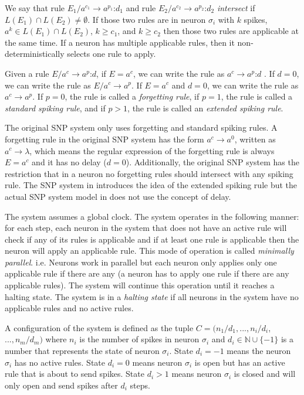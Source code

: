 \documentclass[]{elsarticle}
\theoremstyle{definition}
\theoremstyle{definition}
\newcommand{\ra}{\rightarrow}
\newcommand{\sm}{\text{:}}
\begin{document}
We say that rule $E_1/a^{c_1}\ra a^{p_1}\sm d_1$ and rule $E_2/a^{c_2}\ra a^{p_2}\sm d_2$ \emph{intersect}
if $L(E_1) \cap L(E_2) \neq \emptyset$. If those two rules are in neuron $\sigma_i$ with $k$ spikes,
$a^k \in L(E_1) \cap L(E_2)$, $k\geq c_1$, and $k\geq c_2$ then those two rules are applicable at
the same time. If a neuron has multiple applicable rules, then it non-deterministically selects one
rule to apply.

Given a rule $E/a^c \ra a^p\sm d$, if $E = a^c$, we can write the rule as $a^c \ra a^p\sm d$ . If $d=0$, 
we can write the rule as $E/a^c \ra a^p$. If $E=a^c$ and $d=0$, we can write the rule as $a^c \ra 
a^p$. If $p=0$, the rule is called a \emph{forgetting rule}, if $p=1$, the rule is called a 
\emph{standard spiking rule}, and if $p>1$, the rule is called an \emph{extended spiking rule}.

The original SNP system \cite{ionescu-2006-snp} only uses forgetting and standard spiking rules.
A forgetting rule in the original SNP system has the form $a^c \ra a^0$, written as $a^c\ra\lambda$,
which means the regular expression of the forgetting rule is always $E=a^c$ and it has no delay
($d=0$). Additionally, the original SNP system has the restriction that in a neuron no forgetting 
rules should intersect with any spiking rule. The SNP system in \cite{chen-2008-snp-e} introduces
the idea of the extended spiking rule but the actual SNP system model in \cite{chen-2008-snp-e} does
not use the concept of delay. 

The system assumes a global clock. The system operates in the following manner: for each step, each 
neuron in the system that does not have an active rule will check if any of its rules is applicable 
and if at least one rule is applicable then the neuron will apply an applicable rule. This mode of
operation is called \emph{minimally parallel}. i.e. Neurons work in parallel but each neuron only
applies only one applicable rule if there are any (a neuron has to apply one rule if there are any
applicable rules). The system will continue this operation until it reaches a halting state. The 
system is in a \emph{halting state} if all neurons in the system have no applicable rules and no
active rules. 

A configuration of the system is defined as the tuple $ C = (n_1/d_1,...,n_i/d_i,$ $...,n_m/d_m)$ 
where $n_i$ is the number of spikes in neuron $\sigma_i$ and $d_i \in \mathbb{N} \cup \{-1\}$ is a
number that represents the state of neuron $\sigma_i$. State $d_i=-1$ means the neuron $\sigma_i$ 
has no active rules. State $d_i=0$ means neuron $\sigma_i$ is open but has an active rule that is 
about to send spikes. State $d_i > 1$ means neuron $\sigma_i$ is closed and will only open and send 
spikes after $d_i$ steps. 
\end{document}
